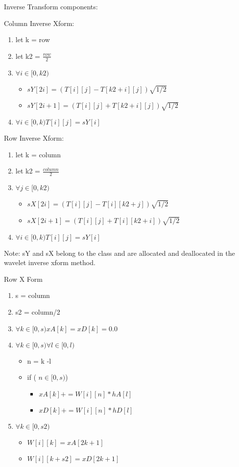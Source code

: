 \documentclass{article}
\begin{document}
Inverse Transform components:

Column Inverse Xform:

\begin{enumerate}
\item let k = row
\item let k2 = $\frac{row}{2}$
\item $\forall i \in [0,k2) $
\begin{itemize}
\item $sY[2i]=(T[i][j]-T[k2+i][j] ) \sqrt{1/2}$
\item $sY[2i+1]=(T[i][j]+T[k2+i][j] ) \sqrt{1/2}$

\end{itemize}
\item $\forall i \in [0,k) T[i][j] = sY[i]$
\end{enumerate}

Row Inverse Xform:

\begin{enumerate}
\item let k = column
\item let k2 = $\frac{column}{2}$
\item $\forall j \in [0,k2) $
\begin{itemize}
\item $sX[2i]=(T[i][j]-T[i][k2+j] ) \sqrt{1/2}$
\item $sX[2i+1]=(T[i][j]+T[i][k2+i] ) \sqrt{1/2}$

\end{itemize}
\item $\forall i \in [0,k) T[i][j] = sY[i]$
\end{enumerate}

Note: sY and sX belong to the class and are allocated and deallocated in the wavelet inverse xform method. 

Row X Form 

\begin{enumerate}
\item s = column
\item s2 = column/2
\item $\forall k \in [0,s) xA[k] = xD[k] = 0.0$
\item $\forall k \in [0,s) \forall l \in [0,l)$
\begin {itemize}
\item n = k -l
\item if ( $n \in [0,s)$) 
\begin{itemize}
\item $xA[k] += W[i][n] * hA[l]$
\item $xD[k] += W[i][n] * hD[l]$
\end {itemize}
\end {itemize}
\item $\forall k \in [0,s2) $
\begin{itemize}
\item $W[i][k] = xA[2k+1]$
\item $W[i][k+s2] = xD[2k+1]$
\end{itemize}
\end{enumerate}
\end{document}
